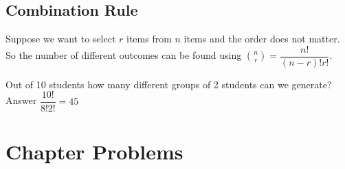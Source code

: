 \documentclass[]{book}
\theoremstyle{definition}
\theoremstyle{definition}
\theoremstyle{definition}
\theoremstyle{remark}
\begin{document}
\hypertarget{combination-rule}{%
\subsection{Combination Rule}\label{combination-rule}}

Suppose we want to select \(r\) items from \(n\) items and the order
does not matter. So the number of different outcomes can be found using
\(\binom{n}{r} = \dfrac{n!}{(n-r)!r!}\).

Out of 10 students how many different groups of 2 students can we
generate? Answer \(\dfrac{10!}{8!2!} = 45\)

\hypertarget{chapter-problems}{%
\section{Chapter Problems}\label{chapter-problems}}
\end{document}
